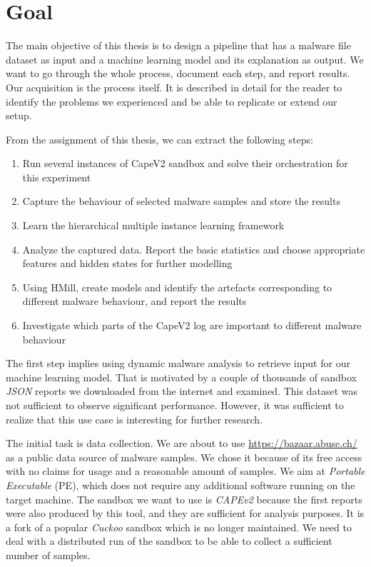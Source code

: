 \section*{Goal}
The main objective of this thesis is to design a pipeline that has a malware file dataset as input and a machine learning model and its explanation as output. We want to go through the whole process, document each step, and report results. Our acquisition is the process itself. It is described in detail for the reader to identify the problems we experienced and be able to replicate or extend our setup.

From the assignment of this thesis, we can extract the following steps:
\begin{enumerate}
    \itemsep0em 
    \item Run several instances of CapeV2 \cite{Cape} sandbox and solve their orchestration for this experiment
    \item Capture the behaviour of selected malware samples and store the results
    \item Learn the hierarchical multiple instance learning framework
    \item Analyze the captured data. Report the basic statistics and choose appropriate features and hidden states for further modelling
    \item Using HMill, create models and identify the artefacts corresponding to different malware behaviour, and report the results
    \item Investigate which parts of the CapeV2 log are important to different malware behaviour
\end{enumerate}

The first step implies using dynamic malware analysis to retrieve input for our machine learning model. That is motivated by a couple of thousands of sandbox \emph{JSON} reports we downloaded from the internet and examined. This dataset was not sufficient to observe significant performance. However, it was sufficient to realize that this use case is interesting for further research.

The initial task is data collection. We are about to use \url{https://bazaar.abuse.ch/} as a public data source of malware samples. We chose it because of its free access with no claims for usage and a reasonable amount of samples. We aim at \emph{Portable Executable} (PE), which does not require any additional software running on the target machine. The sandbox we want to use is \emph{CAPEv2} \cite{Cape} because the first reports were also produced by this tool, and they are sufficient for analysis purposes.  It is a fork of a popular \emph{Cuckoo} sandbox which is no longer maintained. We need to deal with a distributed run of the sandbox to be able to collect a sufficient number of samples.

